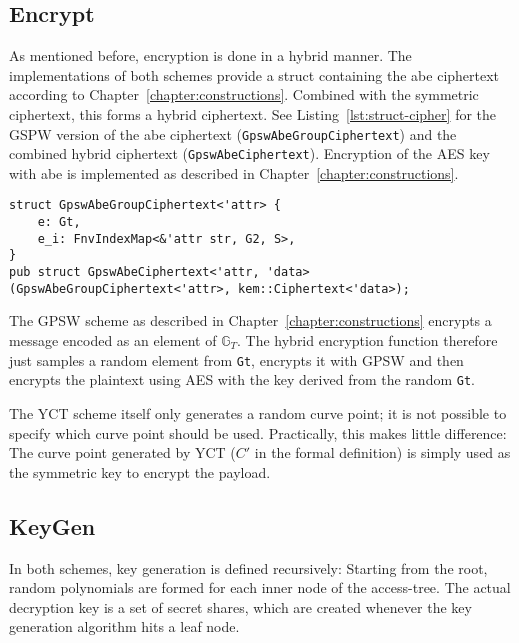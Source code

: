 \subsection{Encrypt}
As mentioned before, encryption is done in a hybrid manner.
The implementations of both schemes provide a struct containing the \acrshort{abe} ciphertext according to Chapter~\ref{chapter:constructions}.
Combined with the symmetric ciphertext, this forms a hybrid ciphertext.
See Listing~\ref{lst:struct-cipher} for the GSPW version of the \acrshort{abe} ciphertext (\verb+GpswAbeGroupCiphertext+) and the combined hybrid ciphertext (\verb+GpswAbeCiphertext+).
Encryption of the AES key with \acrshort{abe} is implemented as described in Chapter~\ref{chapter:constructions}.

\begin{lstlisting}[caption={ABE ciphertext structure for GPSW},label={lst:struct-cipher}, breaklines=true]
struct GpswAbeGroupCiphertext<'attr> {
    e: Gt, 
    e_i: FnvIndexMap<&'attr str, G2, S>,
}
pub struct GpswAbeCiphertext<'attr, 'data>(GpswAbeGroupCiphertext<'attr>, kem::Ciphertext<'data>);
\end{lstlisting}
The GPSW scheme as described in Chapter~\ref{chapter:constructions} encrypts a message encoded as an element of $\mathbb{G}_T$.
The hybrid encryption function therefore just samples a random element from \texttt{Gt}, encrypts it with GPSW and then encrypts the plaintext using AES with the key derived from the random \texttt{Gt}.

The YCT scheme itself only generates a random curve point; it is not possible to specify which curve point should be used.
Practically, this makes little difference:
The curve point generated by YCT ($C'$ in the formal definition) is simply used as the symmetric key to encrypt the payload.
  

\subsection{KeyGen}
In both schemes, key generation is defined recursively:
Starting from the root, random polynomials are formed for each inner node of the \gls{access-tree}.
The actual decryption key is a set of secret shares, which are created whenever the key generation algorithm hits a leaf node.

